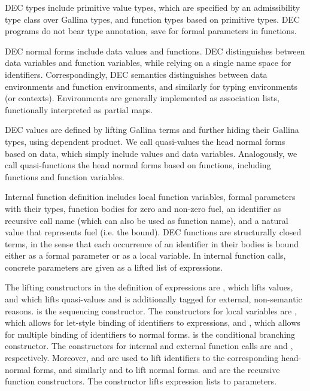 \documentclass{article}
\begin{document}
DEC types include primitive value types, which are specified by an
admissibility type class over Gallina types, and function types based
on primitive types. DEC programs do not bear type annotation, save for
formal parameters in functions.

DEC normal forms include data values and functions. DEC distinguishes
between data variables and function variables, while relying on a
single name space for identifiers. Correspondingly, DEC semantics
distinguishes between data environments and function environments, and
similarly for typing environments (or contexts). Environments are
generally implemented as association lists, functionally interpreted
as partial maps.

DEC values are defined by lifting Gallina terms and further hiding
their Gallina types, using dependent product. We call quasi-values the
head normal forms based on data, which simply include values and data
variables. Analogously, we call quasi-functions the head normal forms
based on functions, including functions and function variables.

Internal function definition includes local function variables, formal
parameters with their types, function bodies for zero and non-zero
fuel, an identifier as recursive call name (which can also be used as
function name), and a natural value that represents fuel (i.e. the
bound). DEC functions are structurally closed terms, in the sense that
each occurrence of an identifier in their bodies is bound either as a
formal parameter or as a local variable. In internal function calls,
concrete parameters are given as a lifted list of expressions.

The lifting constructors in the definition of expressions are
, which lifts values, and  which lifts
quasi-values and is additionally tagged for external, non-semantic
reasons.  is the sequencing constructor. The constructors
for local variables are , which allows for let-style
binding of identifiers to expressions, and , which allows
for multiple binding of identifiers to normal forms. 
is the conditional branching constructor. The constructors for
internal and external function calls are  and
, respectively. Moreover,  and  are
used to lift identifiers to the corresponding head-normal forms, and
similarly  and  to lift normal forms. 
and  are the recursive function constructors. The
constructor  lifts expression lists to parameters.
\end{document}
